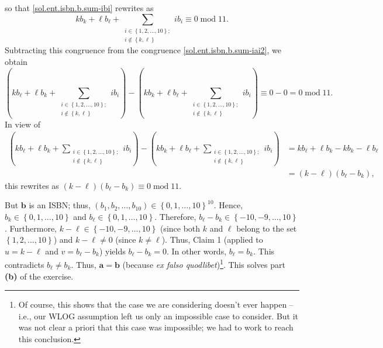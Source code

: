 \documentclass[paper=a4, fontsize=12pt]{scrartcl}%
\let\sumnonlimits\sum
\renewcommand{\sum}{\sumnonlimits\limits}
\theoremstyle{plainsl}
\theoremstyle{definition}
\theoremstyle{remark}
\begin{document}
so that \eqref{sol.ent.isbn.b.sum-ibi} rewrites as%
\[
kb_{k}+\ell b_{\ell}+\sum_{\substack{i\in\left\{  1,2,\ldots,10\right\}
;\\i\notin\left\{  k,\ell\right\}  }}ib_{i}\equiv0\operatorname{mod}11.
\]
Subtracting this congruence from the congruence
\eqref{sol.ent.isbn.b.sum-iai2}, we obtain
\[
\left(  kb_{\ell}+\ell b_{k}+\sum_{\substack{i\in\left\{  1,2,\ldots
,10\right\}  ;\\i\notin\left\{  k,\ell\right\}  }}ib_{i}\right)  -\left(
kb_{k}+\ell b_{\ell}+\sum_{\substack{i\in\left\{  1,2,\ldots,10\right\}
;\\i\notin\left\{  k,\ell\right\}  }}ib_{i}\right)  \equiv
0-0=0\operatorname{mod}11.
\]
In view of
\begin{align*}
\left(  kb_{\ell}+\ell b_{k}+\sum_{\substack{i\in\left\{  1,2,\ldots
,10\right\}  ;\\i\notin\left\{  k,\ell\right\}  }}ib_{i}\right)  -\left(
kb_{k}+\ell b_{\ell}+\sum_{\substack{i\in\left\{  1,2,\ldots,10\right\}
;\\i\notin\left\{  k,\ell\right\}  }}ib_{i}\right)   &  =kb_{\ell}+\ell
b_{k}-kb_{k}-\ell b_{\ell}\\
&  =\left(  k-\ell\right)  \left(  b_{\ell}-b_{k}\right)  ,
\end{align*}
this rewrites as $\left(  k-\ell\right)  \left(  b_{\ell}-b_{k}\right)
\equiv0\operatorname{mod}11$.

But $\mathbf{b}$ is an ISBN; thus, $\left(  b_{1},b_{2},\ldots,b_{10}\right)
\in\left\{  0,1,\ldots,10\right\}  ^{10}$. Hence, $b_{k}\in\left\{
0,1,\ldots,10\right\}  $ and $b_{\ell}\in\left\{  0,1,\ldots,10\right\}  $.
Therefore, $b_{\ell}-b_{k}\in\left\{  -10,-9,\ldots,10\right\}  $.
Furthermore, $k-\ell\in\left\{  -10,-9,\ldots,10\right\}  $ (since both $k$
and $\ell$ belong to the set $\left\{  1,2,\ldots,10\right\}  $) and
$k-\ell\neq0$ (since $k\neq\ell$). Thus, Claim 1 (applied to $u=k-\ell$ and
$v=b_{\ell}-b_{k}$) yields $b_{\ell}-b_{k}=0$. In other words, $b_{\ell}%
=b_{k}$. This contradicts $b_{\ell}\neq b_{k}$. Thus, $\mathbf{a}=\mathbf{b}$
(because \textit{ex falso quodlibet})\footnote{Of course, this shows that the
case we are considering doesn't ever happen -- i.e., our WLOG assumption left
us only an impossible case to consider. But it was not clear a priori that
this case was impossible; we had to work to reach this conclusion.}. This
solves part \textbf{(b)} of the exercise.
\end{document}
